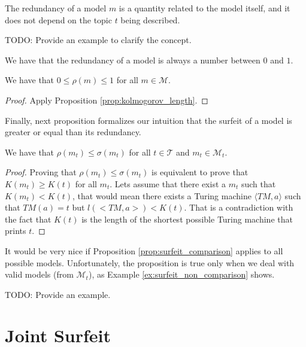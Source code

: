The redundancy of a model $m$ is a quantity related to the model itself, and it does not depend on the topic $t$ being described.

\begin{example}
{\color{red} TODO: Provide an example to clarify the concept.}
\end{example}

We have that the redundancy of a model is always a number between $0$ and $1$.

\begin{proposition}
We have that $0 \leq \rho(m) \leq 1$ for all $m \in \mathcal{M}$.
\end{proposition}
\begin{proof}
Apply Proposition \ref{prop:kolmogorov_length}.
\end{proof}

Finally, next proposition formalizes our intuition that the surfeit of a model is greater or equal than its redundancy.

\begin{proposition}
\label{prop:surfeit_comparison}
We have that $\rho(m_t) \leq \sigma(m_t)$ for all $t \in \mathcal{T}$ and $m_t \in \mathcal{M}_t$.
\end{proposition}
\begin{proof}
Proving that $\rho(m_t) \leq \sigma(m_t)$ is equivalent to prove that $K(m_t) \geq K(t)$ for all $m_t$. Lets assume that there exist a $m_t$ such that $K(m_t) < K(t)$, that would mean there exists a Turing machine $\langle TM, a \rangle$ such that $TM(a)=t$ but $l(<TM, a>) < K(t)$. That is a contradiction with the fact that $K(t)$ is the length of the shortest possible Turing machine that prints $t$.
\end{proof}

It would be very nice if Proposition \ref{prop:surfeit_comparison} applies to all possible models. Unfortunately, the proposition is true only when we deal with valid models (from $\mathcal{M}_t$), as Example \ref{ex:surfeit_non_comparison} shows.

\begin{example}
\label{ex:surfeit_non_comparison}
{\color{red} TODO: Provide an example.}
\end{example}

%
%

\section{Joint Surfeit}

